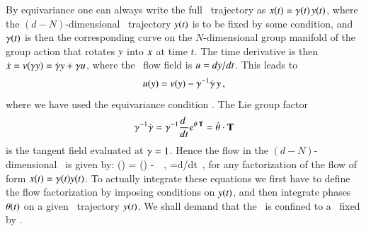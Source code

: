 





\noindent
By equivariance
one can always
write the full \statesp\
trajectory as $x(t)= \gamma(t)\,y(t)$, where the
$(d\!-\!N)$-dimensional \reducedsp\ trajectory $y(t)$
is to be fixed by some condition, and $\gamma(t)$ is then the
corresponding curve on the $N$-dimensional group manifold of
the group action that rotates $y$ into $x$ at time
$t$. The time derivative is then $\dot{x}=
v(\gamma y) = \dot{\gamma}y + \gamma u$,
where the \reducedsp\ flow field is
$u={dy}/{dt}$. This leads to
\[
u(y) = v(y) - \gamma^{-1} \dot{\gamma} \, y
\,,
\]
where we have used the equivariance condition
. The Lie group factor
\[
\gamma^{-1} \dot{\gamma} =
\gamma^{-1}\frac{d~}{dt} e^{{\bf \theta} \cdot \mathbf{T} } =
\dot{{\bf \theta}} \cdot \mathbf{T}
\]
is the tangent field evaluated at ${\gamma} = 1$.
Hence the flow in the
$(d\!-\!N)$-dimensional \reducedsp\ is given by:
\beq
\velRed(\sspRed) = \vel(\sspRed) - \dot{\gSpace} \cdot \Lg \, \sspRed
\,,\qquad
\velRed={d\sspRed}/{dt}
\,,
for any factorization of the flow of form $x(t)=
\gamma(t)y(t)$. To actually integrate these equations
we first have to define the flow factorization by imposing
conditions on $y(t)$, and then integrate phases
${\bf \theta}(t)$ on a given \reducedsp\ trajectory $y(t)$.
We shall demand that the \reducedsp\ is confined to a \slice\
fixed by .

